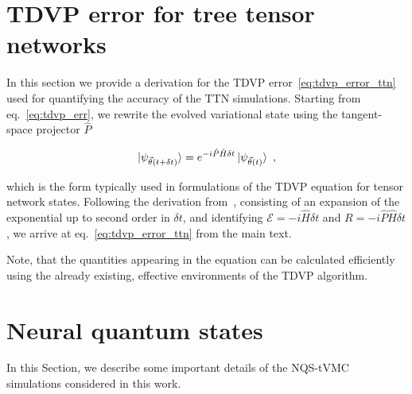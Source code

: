 \documentclass[aps,pra,reprint,amssymb,superscriptaddress]{revtex4-2}
\begin{document}
\section{TDVP error for tree tensor networks} \label{app:tdvp_err}

In this section we provide a derivation for the TDVP error~\eqref{eq:tdvp_error_ttn} used for quantifying the accuracy of the TTN simulations. Starting from eq.~\eqref{eq:tdvp_err}, we rewrite the evolved variational state using the tangent-space projector $\hat{P}$

\begin{equation}
    \ket{\psi_{\vec{\theta}(t + \delta t)}} = e^{-i\hat P \hat H \delta t}\ket{\psi_{\vec{\theta}(t)}}\ ,
\end{equation}

which is the form typically used in formulations of the TDVP equation for tensor network states. Following the derivation from~\cite{schmitt_quantum_2020}, consisting of an expansion of the exponential up to second order in $\delta t$, and identifying $\mathcal{E}=-i\hat H \delta t$ and $R=-i\hat P \hat H \delta t$, we arrive at eq.~\eqref{eq:tdvp_error_ttn} from the main text.

Note, that the quantities appearing in the equation can be calculated efficiently using the already existing, effective environments of the TDVP algorithm.

\section{Neural quantum states}
\label{app:nqs}

In this Section, we describe some important  details of the NQS-tVMC simulations considered in this work.
\end{document}
